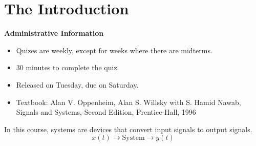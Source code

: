 \chapter{The Introduction}
\large \textbf{Administrative Information}
\begin{itemize}
    \item Quizes are weekly, except for weeks where there are midterms.
    \item 30 minutes to complete the quiz.
    \item Released on Tuesday, due on Saturday.
    \item Textbook: Alan V. Oppenheim, Alan S. Willsky with S. Hamid Nawab, Signals and Systems, Second Edition, Prentice-Hall, 1996
\end{itemize}
\begin{definition}
    [System]
    In this course, systems are devices that convert input signals to output signals.
    \[
        x(t) \to \boxed{\text{System}} \to y(t)
    \]
\end{definition}